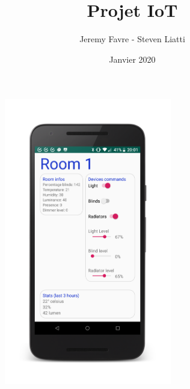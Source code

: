 \documentclass[a4paper, 10pt]{article}
\begin{document}
\title{Projet IoT}
\author{Jeremy Favre - Steven Liatti}
\date{Janvier 2020}
\maketitle
\begin{figure}
    \begin{center}
        \includegraphics[width=0.65\textwidth]{img/app_framed.png}
    \end{center}
\end{figure}
\newpage


\tableofcontents
{}
\listoffigures
\newpage
\renewcommand\listoflistingscaption{Table des listings de code source}
\listoflistings
\end{document}
